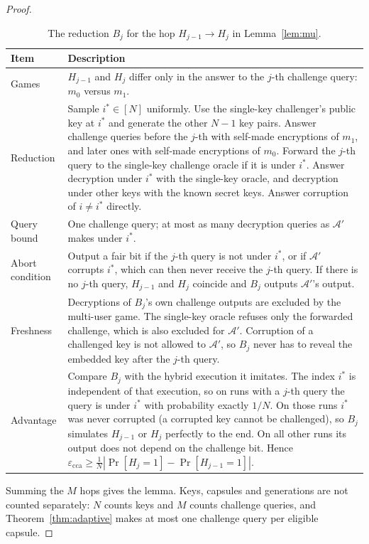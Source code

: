 \documentclass[pdflatex,sn-mathphys-num,twocolumn]{sn-jnl}
\theoremstyle{plain}
\theoremstyle{definition}
\begin{document}
\begin{proof}
\begin{table}[htbp]
\caption{The reduction $B_j$ for the hop $H_{j-1}\to H_j$ in Lemma~\ref{lem:mu}.}\label{tab:mu}
\centering\footnotesize
\begin{tabularx}{\linewidth}{@{}p{.24\linewidth}Y@{}}\toprule
Item & Description\\\midrule
Games & $H_{j-1}$ and $H_j$ differ only in the answer to the $j$-th challenge query: $m_0$ versus $m_1$.\\
Reduction & Sample $i^*\in[N]$ uniformly. Use the single-key challenger's public key at $i^*$ and generate the other $N-1$ key pairs. Answer challenge queries before the $j$-th with self-made encryptions of $m_1$, and later ones with self-made encryptions of $m_0$. Forward the $j$-th query to the single-key challenge oracle if it is under $i^*$. Answer decryption under $i^*$ with the single-key oracle, and decryption under other keys with the known secret keys. Answer corruption of $i\ne i^*$ directly.\\
Query bound & One challenge query; at most as many decryption queries as $\mathcal A'$ makes under $i^*$.\\
Abort condition & Output a fair bit if the $j$-th query is not under $i^*$, or if $\mathcal A'$ corrupts $i^*$, which can then never receive the $j$-th query. If there is no $j$-th query, $H_{j-1}$ and $H_j$ coincide and $B_j$ outputs $\mathcal A'$'s output.\\
Freshness & Decryptions of $B_j$'s own challenge outputs are excluded by the multi-user game. The single-key oracle refuses only the forwarded challenge, which is also excluded for $\mathcal A'$. Corruption of a challenged key is not allowed to $\mathcal A'$, so $B_j$ never has to reveal the embedded key after the $j$-th query.\\
Advantage & Compare $B_j$ with the hybrid execution it imitates. The index $i^*$ is independent of that execution, so on runs with a $j$-th query the query is under $i^*$ with probability exactly $1/N$. On those runs $i^*$ was never corrupted (a corrupted key cannot be challenged), so $B_j$ simulates $H_{j-1}$ or $H_j$ perfectly to the end. On all other runs its output does not depend on the challenge bit. Hence $\varepsilon_{\mathrm{cca}}\ge\frac1N|\Pr[H_j=1]-\Pr[H_{j-1}=1]|$.\\\bottomrule
\end{tabularx}
\end{table}

Summing the $M$ hops gives the lemma. Keys, capsules and generations are not counted separately: $N$ counts keys and $M$ counts challenge queries, and Theorem~\ref{thm:adaptive} makes at most one challenge query per eligible capsule.
\end{proof}
\end{document}
